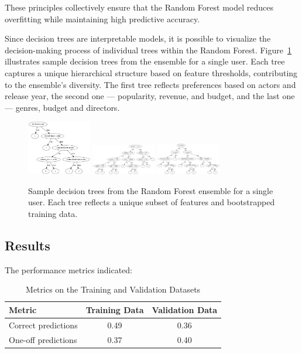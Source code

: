 \documentclass[a4paper,9pt]{article}
\begin{document}
These principles collectively ensure that the Random Forest model reduces overfitting while maintaining high predictive accuracy.

Since decision trees are interpretable models, it is possible to visualize the decision-making process of individual trees within the Random Forest. Figure~\ref{fig:random_forest_trees} illustrates sample decision trees from the ensemble for a single user. Each tree captures a unique hierarchical structure based on feature thresholds, contributing to the ensemble's diversity.
The first tree reflects preferences based on actors and release year, the second one --- popularity, revenue, and budget, and the last one --- genres, budget and directors.

\begin{figure}[h!]
	\centering
	\includegraphics[width=0.25\textwidth]{forest/tree_0.png}
	\includegraphics[width=0.25\textwidth]{forest/tree_9.png}
	\includegraphics[width=0.25\textwidth]{forest/tree_4.png}
	\caption{Sample decision trees from the Random Forest ensemble for a single user. Each tree reflects a unique subset of features and bootstrapped training data.}
	\label{fig:random_forest_trees}
\end{figure}

\subsection{Results}
The performance metrics indicated:

\begin{table}[ht]
	\centering
	\begin{tabular}{|l|c|c|}
		\hline
		\textbf{Metric}     & \textbf{Training Data} & \textbf{Validation Data} \\ \hline
		Correct predictions & 0.49                   & 0.36                     \\ \hline
		One-off predictions & 0.37                   & 0.40                     \\ \hline
	\end{tabular}
	\caption{Metrics on the Training and Validation Datasets}
	\label{tab:random_forest_results}
\end{table}
\end{document}
